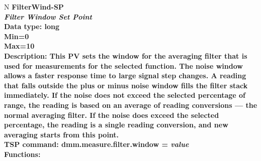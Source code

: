 \documentclass[openany]{article}
\begin{document}
		\begin{tabular}{N}
			\hline
			\bfseries FilterWind-SP\label{pv:filterwind-sp} \\ \hline
			\emph{Filter Window Set Point} \\
			Data type: long \\
			Min=0 \\
			Max=10 \\
			Description: This PV sets the window for the averaging filter that is used for measurements for the selected function. The noise window allows a faster response time to large signal step changes. A reading that falls outside the plus or minus noise window fills the filter stack immediately. If the noise does not exceed the selected percentage of range, the reading is based on an average of reading conversions — the normal averaging filter. If the noise does exceed the selected percentage, the reading is a single reading conversion, and new averaging starts from this point. \\
			TSP command: dmm.measure.filter.window = \emph{value} \\
			Functions: \\
			\arrayrulecolor{\FuncTableBorderColor}

		\end{tabular}
\end{document}
